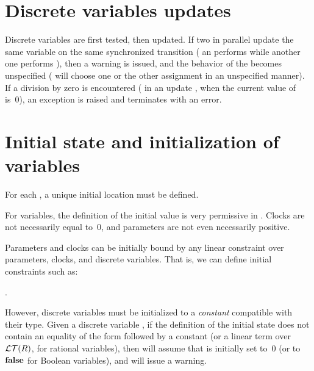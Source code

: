 \section{Discrete variables updates}\label{section:discrete_boolean}

Discrete variables are first tested, then updated.
If two \IPTA{} in parallel update the same variable on the same synchronized transition (\eg{} an \IPTA{} performs  while another one performs ), then a warning is issued, and the behavior of the \NIPTA{} becomes unspecified (\ie{} \imitator{} will choose one or the other assignment in an unspecified manner).
If a division by zero is encountered (\eg{} in an update , when the current value of~ is~0), an exception is raised and \imitator{} terminates with an error.

\section{Initial state and initialization of variables}\label{section:init}

For each \IPTA{}, a unique initial location must be defined.

For variables, the definition of the initial value is very permissive in \imitator{}.
Clocks are not necessarily equal to~0, and parameters are not even necessarily positive.

Parameters and clocks can be initially bound by any linear constraint over parameters, clocks, and discrete variables.
That is, we can define initial constraints such as:
\begin{center}
	.
\end{center}

However, discrete variables must be initialized to a \emph{constant} compatible with their type.
Given a discrete variable , if the definition of the initial state does not contain an equality of the form  followed by a constant (or a linear term over~$\mathcal{LT}(R)$, for rational variables), then \imitator{} will assume that  is initially set to~0 (or to $\mathbf{false}$ for Boolean variables), and will issue a warning.



